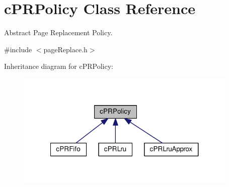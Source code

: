 \hypertarget{classcPRPolicy}{\section{c\-P\-R\-Policy \-Class \-Reference}
\label{d7/df0/classcPRPolicy}
}


\-Abstract \-Page \-Replacement \-Policy.  




{\ttfamily \#include $<$page\-Replace.\-h$>$}



\-Inheritance diagram for c\-P\-R\-Policy\-:\nopagebreak
\begin{figure}[H]
\begin{center}
\leavevmode
\includegraphics[width=299pt]{d6/d74/classcPRPolicy__inherit__graph}
\end{center}
\end{figure}
